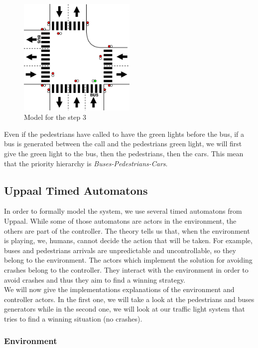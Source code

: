 \begin{figure}[H]\label{fig:step3bus}
  \centering
    \includegraphics[width=0.5\textwidth]{picture/model/trafficlight_step3_s2.png}
    \caption{Model for the step 3}
\end{figure}


\noindent Even if the pedestrians have called to have the green lights before the bus, if a bus is generated between the call and the pedestrians green light, we will first give the green light to the bus, then the pedestrians, then the cars. This mean that the priority hierarchy is \textit{Buses-Pedestrians-Cars}.


\subsection{Uppaal Timed Automatons}
In order to formally model the system, we use several timed automatons from Uppaal. While some of those automatons are actors in the environment, the others are part of the controller.
The theory tells us that, when the environment is playing, we, humans, cannot decide the action that will be taken. For example, buses and pedestrians arrivals are unpredictable and uncontrollable, so they belong to the environment.
The actors which implement the solution for avoiding crashes belong to the controller. They interact with the environment in order to avoid crashes and thus they aim to find a winning strategy. \\
We will now give the implementations explanations of the environment and controller actors. In the first one, we will take a look at the pedestrians and buses generators while in the second one, we will look at our traffic light system that tries to find a winning situation (no crashes).

\subsubsection{Environment}
